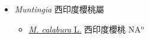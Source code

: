 
  \begin{itemize}
 \item[] \textit{Muntingia} 西印度櫻桃屬
                    
  \begin{itemize}
        \item[] \href{http://www.theplantlist.org/tpl1.1/search?q=Muntingia+calabura}{\textit{M. calabura} L.}   西印度櫻桃 NA$^n$
  \end{itemize}
  \end{itemize}
